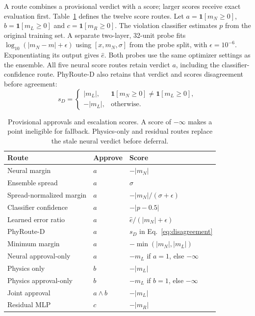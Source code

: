 A route combines a provisional verdict with a score; larger scores receive exact evaluation first. Table~\ref{tab:policies} defines the twelve score routes. Let $a=\mathbf{1}[m_N\geq0]$, $b=\mathbf{1}[m_L\geq0]$ and $c=\mathbf{1}[m_R\geq0]$. The violation classifier estimates $p$ from the original training set. A separate two-layer, 32-unit probe fits $\log_{10}(|m_N-m|+\epsilon)$ using $[x,m_N,\sigma]$ from the probe split, with $\epsilon=10^{-6}$. Exponentiating its output gives $\hat e$. Both probes use the same optimizer settings as the ensemble. All five neural score routes retain verdict $a$, including the classifier-confidence route. PhyRoute-D also retains that verdict and scores disagreement before agreement:
\begin{equation}
 s_D=\begin{cases}
 |m_L|,&\mathbf{1}[m_N\geq0]\ne\mathbf{1}[m_L\geq0],\\
 -|m_L|,&\text{otherwise}.
 \end{cases}
 \label{eq:disagreement}
\end{equation}
\begin{table}[tb]
\caption{Provisional approvals and escalation scores. A score of $-\infty$ makes a point ineligible for fallback. Physics-only and residual routes replace the stale neural verdict before deferral.}
\label{tab:policies}
\centering\small
\begin{tabular}{lll}
\toprule
Route & Approve & Score \\
\midrule
Neural margin & $a$ & $-|m_N|$ \\
Ensemble spread & $a$ & $\sigma$ \\
Spread-normalized margin & $a$ & $-|m_N|/(\sigma+\epsilon)$ \\
Classifier confidence & $a$ & $-|p-0.5|$ \\
Learned error ratio & $a$ & $\hat e/(|m_N|+\epsilon)$ \\
PhyRoute-D & $a$ & $s_D$ in Eq.~\eqref{eq:disagreement} \\
Minimum margin & $a$ & $-\min(|m_N|,|m_L|)$ \\
Neural approval-only & $a$ & $-m_L$ if $a=1$, else $-\infty$ \\
Physics only & $b$ & $-|m_L|$ \\
Physics approval-only & $b$ & $-m_L$ if $b=1$, else $-\infty$ \\
Joint approval & $a\land b$ & $-|m_L|$ \\
Residual MLP & $c$ & $-|m_R|$ \\
\bottomrule
\end{tabular}
\end{table}

